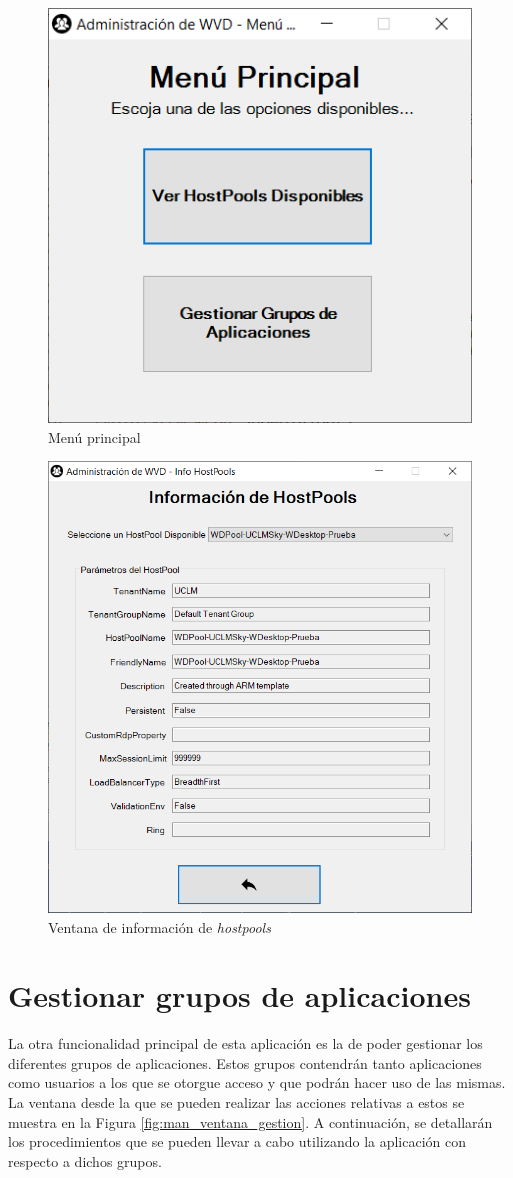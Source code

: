 \begin{figure}[h]
  \centering
  \includegraphics[width=0.6\linewidth]{figures/images/script/menu_ppal.PNG}
  \caption{Menú principal}
  \label{fig:man_menu_ppal}
\end{figure}

\begin{figure}[h]
  \centering
  \includegraphics[width=0.8\linewidth]{figures/images/script/info_hostpools.PNG}
  \caption{Ventana de información de \textit{hostpools}}
  \label{fig:man_info_hostpools}
\end{figure}

\clearpage

\section{Gestionar grupos de aplicaciones}
La otra funcionalidad principal de esta aplicación es la de poder gestionar los diferentes grupos de aplicaciones. Estos grupos contendrán tanto aplicaciones como usuarios a los que se otorgue acceso y que podrán hacer uso de las mismas. La ventana desde la que se pueden realizar las acciones relativas a estos se muestra en la Figura \ref{fig:man_ventana_gestion}.  A continuación, se detallarán los procedimientos que se pueden llevar a cabo utilizando la aplicación con respecto a dichos grupos.


